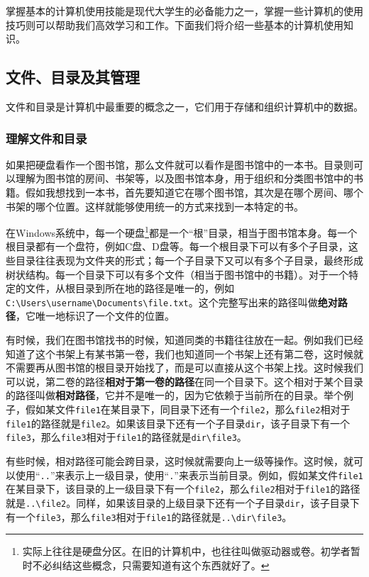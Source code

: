\documentclass[../main.tex]{subfiles}
\begin{document}
掌握基本的计算机使用技能是现代大学生的必备能力之一，掌握一些计算机的使用技巧则可以帮助我们高效学习和工作。下面我们将介绍一些基本的计算机使用知识。

\subsection{文件、目录及其管理}

文件和目录是计算机中最重要的概念之一，它们用于存储和组织计算机中的数据。

\subsubsection{理解文件和目录}

如果把硬盘看作一个图书馆，那么文件就可以看作是图书馆中的一本书。目录则可以理解为图书馆的房间、书架等，以及图书馆本身，用于组织和分类图书馆中的书籍。假如我想找到一本书，首先要知道它在哪个图书馆，其次是在哪个房间、哪个书架的哪个位置。这样就能够使用统一的方式来找到一本特定的书。

在Windows系统中，每一个硬盘\footnote{实际上往往是硬盘分区。在旧的计算机中，也往往叫做驱动器或卷。初学者暂时不必纠结这些概念，只需要知道有这个东西就好了。}都是一个“根”目录，相当于图书馆本身。每一个根目录都有一个盘符，例如C盘、D盘等。每一个根目录下可以有多个子目录，这些目录往往表现为文件夹的形式；每一个子目录下又可以有多个子目录，最终形成树状结构。每一个目录下可以有多个文件（相当于图书馆中的书籍）。对于一个特定的文件，从根目录到所在地的路径是唯一的，例如\texttt{C:\textbackslash Users\textbackslash username\textbackslash Documents\textbackslash file.txt}。这个完整写出来的路径叫做\textbf{绝对路径}，它唯一地标识了一个文件的位置。

有时候，我们在图书馆找书的时候，知道同类的书籍往往放在一起。例如我们已经知道了这个书架上有某书第一卷，我们也知道同一个书架上还有第二卷，这时候就不需要再从图书馆的根目录开始找了，而是可以直接从这个书架上找。这时候我们可以说，第二卷的路径\textbf{相对于第一卷的路径}在同一个目录下。这个相对于某个目录的路径叫做\textbf{相对路径}，它并不是唯一的，因为它依赖于当前所在的目录。举个例子，假如某文件\texttt{file1}在某目录下，同目录下还有一个\texttt{file2}，那么\texttt{file2}相对于\texttt{file1}的路径就是\texttt{file2}。如果该目录下还有一个子目录\texttt{dir}，该子目录下有一个\texttt{file3}，那么\texttt{file3}相对于\texttt{file1}的路径就是\texttt{dir\textbackslash file3}。

有些时候，相对路径可能会跨目录，这时候就需要向上一级等操作。这时候，就可以使用“\texttt{..}”来表示上一级目录，使用“\texttt{.}”来表示当前目录。例如，假如某文件\texttt{file1}在某目录下，该目录的上一级目录下有一个\texttt{file2}，那么\texttt{file2}相对于\texttt{file1}的路径就是\texttt{..\textbackslash file2}。同样，如果该目录的上级目录下还有一个子目录\texttt{dir}，该子目录下有一个\texttt{file3}，那么\texttt{file3}相对于\texttt{file1}的路径就是\texttt{..\textbackslash dir\textbackslash file3}。
\end{document}
